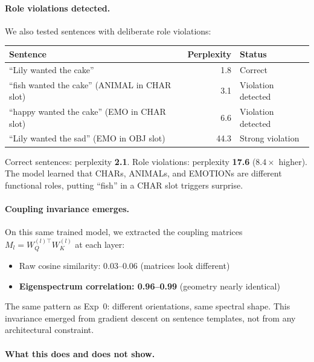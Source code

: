 \documentclass[11pt, a4paper]{article}
\theoremstyle{remark}
\begin{document}
\paragraph{Role violations detected.}
We also tested sentences with deliberate role violations:
\begin{center}\small
\renewcommand{\arraystretch}{1.2}
\begin{tabular}{@{}lrl@{}}
\toprule
\textbf{Sentence} & \textbf{Perplexity} & \textbf{Status} \\
\midrule
``Lily wanted the cake'' & 1.8 & Correct \\
``fish wanted the cake'' (ANIMAL in CHAR slot) & 3.1 & Violation detected \\
``happy wanted the cake'' (EMO in CHAR slot) & 6.6 & Violation detected \\
``Lily wanted the sad'' (EMO in OBJ slot) & 44.3 & Strong violation \\
\bottomrule
\end{tabular}
\end{center}

\noindent
Correct sentences: perplexity \textbf{2.1}. Role violations: perplexity \textbf{17.6} ($8.4\times$ higher).
The model learned that CHARs, ANIMALs, and EMOTIONs are different functional roles, putting ``fish'' in a CHAR slot triggers surprise.

\paragraph{Coupling invariance emerges.}
On this same trained model, we extracted the coupling matrices $M_l = W_Q^{(l)\top} W_K^{(l)}$ at each layer:
\begin{itemize}[nosep]
    \item Raw cosine similarity: 0.03--0.06 (matrices look different)
    \item \textbf{Eigenspectrum correlation: 0.96--0.99} (geometry nearly identical)
\end{itemize}
The same pattern as Exp~0: different orientations, same spectral shape.
This invariance emerged from gradient descent on sentence templates, not from any architectural constraint.

\paragraph{What this does and does not show.}
\end{document}
